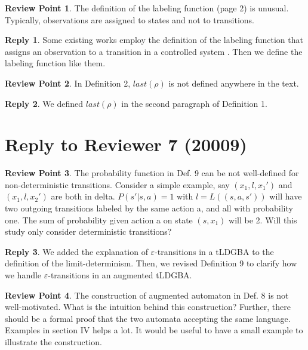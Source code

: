 \documentclass[10 pt, dvipdfmx]{article}
\theoremstyle{definition}
\newtheorem{review point}{Review Point}[section]
\newtheorem*{reply}{Reply}
\begin{document}
\begin{review point}
  The definition of the labeling function (page 2) is unusual. Typically, observations are assigned to states and not to transitions.
\end{review point}

\begin{reply}
  Some existing works employ the definition of the labeling function that assigns an observation to a transition in a controlled system \cite{Mealy1955, ARTR2019}. Then we define the labeling function like them.
\end{reply}

\begin{review point}
  In Definition 2, $last(\rho)$ is not defined anywhere in the text.
\end{review point}

\begin{reply}
  We defined $last(\rho)$ in the second paragraph of Definition 1.
\end{reply}

\section{Reply to Reviewer 7 (20009)}

\begin{review point}
  The probability function in Def. 9 can be not well-defined for
non-deterministic transitions. Consider a simple example, say $(x_1, l,
x_1')$ and $(x_1, l, x_2')$ are both in delta. $P(s'|s, a) =1$ with $l=
L((s,a,s'))$ will have two outgoing transitions labeled by the same
action a, and all with probability one. The sum of probability given
action a on state $(s, x_1)$ will be 2. Will this study only consider
deterministic transitions?
\end{review point}

\begin{reply}
  We added the explanation of $\varepsilon$-transitions in a tLDGBA to the definition of the limit-determinism. Then, we revised Definition 9 to clarify how we handle $\varepsilon$-transitions in an augmented tLDGBA.
\end{reply}

\begin{review point}
  The construction of augmented automaton in Def. 8 is not
well-motivated. What is the intuition behind this construction?
Further, there should be a formal proof that the two automata accepting
the same language. Examples in section IV helps a lot. It would be
useful to have a small example to illustrate the construction.
\end{review point}
\end{document}
